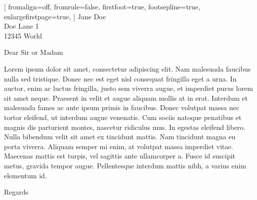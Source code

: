 \documentclass[
	a4paper,
	version=last,
	11pt,
]{scrlttr2}
\begin{document}
\setlength{\parindent}{0pt}





\begin{letter}[
	fromalign=off, %
	fromrule=false, %
	firstfoot=true,
	footsepline=true,
	enlargefirstpage=true,
]{
	Jane Doe\\
	Doe Lane 1\\
	12345 World
}


\opening{Dear Sir or Madam}

Lorem ipsum dolor sit amet, consectetur adipiscing elit. Nam malesuada faucibus nulla sed tristique. Donec nec est eget nisl consequat fringilla eget a urna. In auctor, enim ac luctus fringilla, justo sem viverra augue, et imperdiet purus lorem sit amet neque. Praesent in velit et augue aliquam mollis at in erat. Interdum et malesuada fames ac ante ipsum primis in faucibus. Donec volutpat massa nec tortor eleifend, ut interdum augue venenatis. Cum sociis natoque penatibus et magnis dis parturient montes, nascetur ridiculus mus. In egestas eleifend libero. Nulla bibendum velit sit amet ex tincidunt mattis. Nam tincidunt magna eu porta viverra. Aliquam semper mi enim, at volutpat massa imperdiet vitae. Maecenas mattis est turpis, vel sagittis ante ullamcorper a. Fusce id suscipit metus, gravida tempor augue. Pellentesque interdum mattis nibh, a varius enim elementum id. 

\vfill

\closing{Regards}
	

\end{letter}
\end{document}
